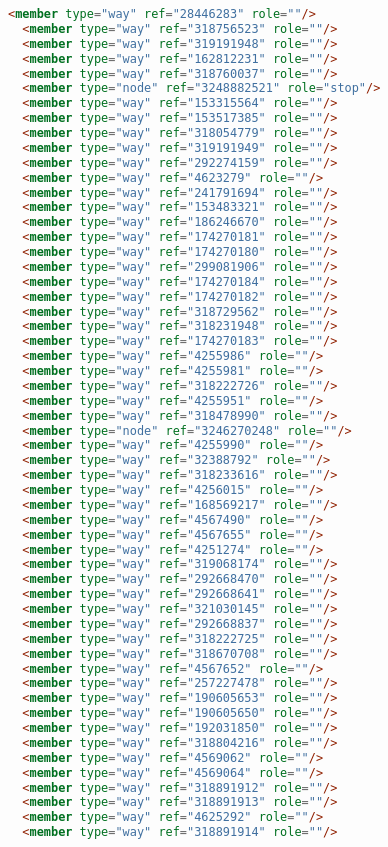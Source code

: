 \begin{lstlisting}[language=HTML,basicstyle=\tiny,caption=bandung1.xml]
  <member type="way" ref="28446283" role=""/>
  <member type="way" ref="318756523" role=""/>
  <member type="way" ref="319191948" role=""/>
  <member type="way" ref="162812231" role=""/>
  <member type="way" ref="318760037" role=""/>
  <member type="node" ref="3248882521" role="stop"/>
  <member type="way" ref="153315564" role=""/>
  <member type="way" ref="153517385" role=""/>
  <member type="way" ref="318054779" role=""/>
  <member type="way" ref="319191949" role=""/>
  <member type="way" ref="292274159" role=""/>
  <member type="way" ref="4623279" role=""/>
  <member type="way" ref="241791694" role=""/>
  <member type="way" ref="153483321" role=""/>
  <member type="way" ref="186246670" role=""/>
  <member type="way" ref="174270181" role=""/>
  <member type="way" ref="174270180" role=""/>
  <member type="way" ref="299081906" role=""/>
  <member type="way" ref="174270184" role=""/>
  <member type="way" ref="174270182" role=""/>
  <member type="way" ref="318729562" role=""/>
  <member type="way" ref="318231948" role=""/>
  <member type="way" ref="174270183" role=""/>
  <member type="way" ref="4255986" role=""/>
  <member type="way" ref="4255981" role=""/>
  <member type="way" ref="318222726" role=""/>
  <member type="way" ref="4255951" role=""/>
  <member type="way" ref="318478990" role=""/>
  <member type="node" ref="3246270248" role=""/>
  <member type="way" ref="4255990" role=""/>
  <member type="way" ref="32388792" role=""/>
  <member type="way" ref="318233616" role=""/>
  <member type="way" ref="4256015" role=""/>
  <member type="way" ref="168569217" role=""/>
  <member type="way" ref="4567490" role=""/>
  <member type="way" ref="4567655" role=""/>
  <member type="way" ref="4251274" role=""/>
  <member type="way" ref="319068174" role=""/>
  <member type="way" ref="292668470" role=""/>
  <member type="way" ref="292668641" role=""/>
  <member type="way" ref="321030145" role=""/>
  <member type="way" ref="292668837" role=""/>
  <member type="way" ref="318222725" role=""/>
  <member type="way" ref="318670708" role=""/>
  <member type="way" ref="4567652" role=""/>
  <member type="way" ref="257227478" role=""/>
  <member type="way" ref="190605653" role=""/>
  <member type="way" ref="190605650" role=""/>
  <member type="way" ref="192031850" role=""/>
  <member type="way" ref="318804216" role=""/>
  <member type="way" ref="4569062" role=""/>
  <member type="way" ref="4569064" role=""/>
  <member type="way" ref="318891912" role=""/>
  <member type="way" ref="318891913" role=""/>
  <member type="way" ref="4625292" role=""/>
  <member type="way" ref="318891914" role=""/>

\end{lstlisting}
